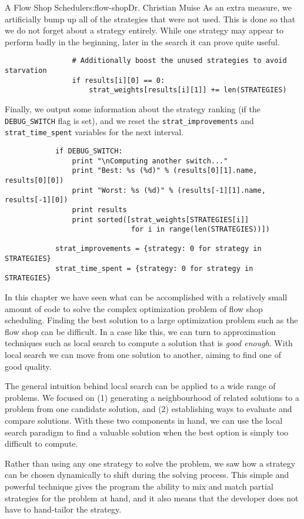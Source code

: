 \begin{aosachapter}{A Flow Shop Scheduler}{s:flow-shop}{Dr. Christian Muise}
As an extra measure, we artificially bump up all of the strategies that
were not used. This is done so that we do not forget about a strategy
entirely. While one strategy may appear to perform badly in the
beginning, later in the search it can prove quite useful.

\begin{verbatim}
                # Additionally boost the unused strategies to avoid starvation
                if results[i][0] == 0:
                    strat_weights[results[i][1]] += len(STRATEGIES)
\end{verbatim}

Finally, we output some information about the strategy ranking (if the
\texttt{DEBUG\_SWITCH} flag is set), and we reset the
\texttt{strat\_improvements} and \texttt{strat\_time\_spent} variables
for the next interval.

\begin{verbatim}
            if DEBUG_SWITCH:
                print "\nComputing another switch..."
                print "Best: %s (%d)" % (results[0][1].name, results[0][0])
                print "Worst: %s (%d)" % (results[-1][1].name, results[-1][0])
                print results
                print sorted([strat_weights[STRATEGIES[i]] 
                              for i in range(len(STRATEGIES))])

            strat_improvements = {strategy: 0 for strategy in STRATEGIES}
            strat_time_spent = {strategy: 0 for strategy in STRATEGIES}
\end{verbatim}

\label{discussion}

In this chapter we have seen what can be accomplished with a relatively
small amount of code to solve the complex optimization problem of flow
shop scheduling. Finding the best solution to a large optimization
problem such as the flow shop can be difficult. In a case like this, we
can turn to approximation techniques such as local search to compute a
solution that is \emph{good enough}. With local search we can move from
one solution to another, aiming to find one of good quality.

The general intuition behind local search can be applied to a wide range
of problems. We focused on (1) generating a neighbourhood of related
solutions to a problem from one candidate solution, and (2) establishing
ways to evaluate and compare solutions. With these two components in
hand, we can use the local search paradigm to find a valuable solution
when the best option is simply too difficult to compute.

Rather than using any one strategy to solve the problem, we saw how a
strategy can be chosen dynamically to shift during the solving process.
This simple and powerful technique gives the program the ability to mix
and match partial strategies for the problem at hand, and it also means
that the developer does not have to hand-tailor the strategy.

\end{aosachapter}
